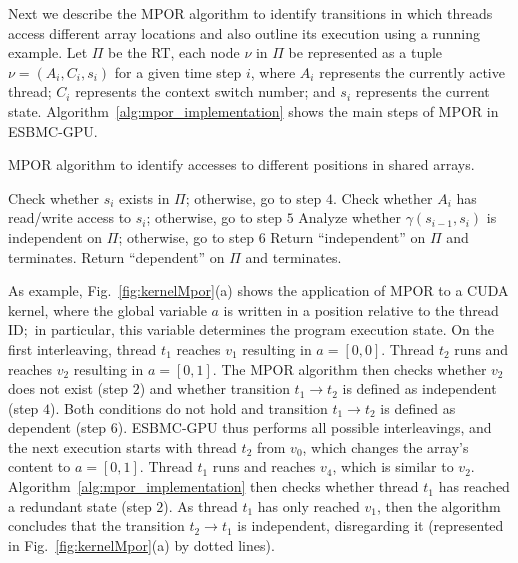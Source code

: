 \documentclass[times, doublespace]{cpeauth}
\begin{document}
Next we describe the MPOR algorithm to identify transitions in which threads access different array locations and also outline its execution using a running example. Let $\Pi$ be the RT, each node $\nu$ in $\Pi$ be represented as a tuple $\nu = (A_i, C_i, s_i)$ for a given time step $i$, where $A_i$ represents the currently active thread; $C_i$ represents the context switch number; and $s_i$ represents the current state. Algorithm~\ref{alg:mpor_implementation} shows the main steps of MPOR in ESBMC-GPU.

\begin{algorithm}
\caption{MPOR algorithm to identify accesses to different positions in shared arrays.}
\label{alg:mpor_implementation}
\begin{algorithmic}[1]
  \State Check whether $s_i$ exists in $\Pi$; otherwise, go to step $4$.
  \State Check whether $A_i$ has read/write access to $s_i$; otherwise, go to step $5$
  \State Analyze whether $\gamma\left(s_{i-1},s_i\right)$ is independent on $\Pi$; otherwise, go to step $6$  
  \State Return ``independent'' on $\Pi$ and terminates.
	\State Return ``dependent'' on $\Pi$ and terminates.
  \EndFunction
\end{algorithmic}
\end{algorithm}


As example, Fig.~\ref{fig:kernelMpor}(a) shows the application of MPOR to a CUDA kernel, where the global variable $a$ is written in a position relative to the thread ID;\ in particular, this variable determines the program execution state. On the first interleaving, thread $t_{1}$ reaches $v_1$ resulting in $a=[0,0]$. Thread $t_{2}$ runs and reaches $v_2$ resulting in $a=[0,1]$. The MPOR algorithm then checks whether $v_2$ does not exist (step $2$) and whether transition $t_1 \rightarrow t_2$ is defined as independent (step $4$). Both conditions do not hold and transition $t_1 \rightarrow t_2$ is defined as dependent (step $6$). ESBMC-GPU thus performs all possible interleavings, and the next execution starts with thread $t_2$ from $v_0$, which changes the array's content to $a=[0,1]$. Thread $t_1$ runs and reaches $v_4$, which is similar to $v_2$. Algorithm~\ref{alg:mpor_implementation} then checks whether thread $t_1$ has reached a redundant state (step $2$). As thread $t_1$ has only reached $v_1$, then the algorithm concludes that the transition $t_2 \rightarrow t_1$ is independent, disregarding it (represented in Fig.~\ref{fig:kernelMpor}(a) by dotted lines).
\end{document}
